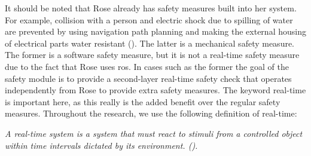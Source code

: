 \documentclass[12pt]{scrreprt}
\begin{document}
 
It should be noted that Rose already has safety measures built into her system. For example, collision with a person and electric shock due to spilling of water are prevented by using navigation path planning and making the external housing of electrical parts water resistant (\cite{risk_analysis}). The latter is a mechanical safety measure. The former is a software safety measure, but it is not a real-time safety measure due to the fact that Rose uses \acrshort{ros}. In cases such as the former the goal of the safety module is to provide a second-layer real-time safety check that operates independently from Rose to provide extra safety measures. The keyword real-time is important here, as this really is the added benefit over the regular safety measures. Throughout the research, we use the following definition of real-time: 

\begin{flushleft}
\textit{
A real-time system is a system that must react to stimuli from a controlled object within time intervals dictated by its environment. (\cite{realtime_systems}).
}
\end{flushleft}
\end{document}
